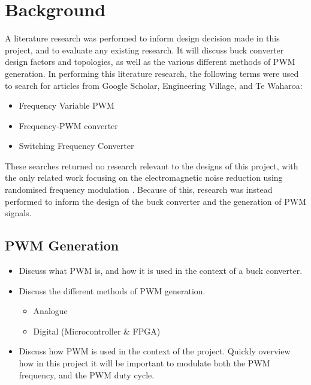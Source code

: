 \chapter{Background}\label{C:background}

A literature research was performed to inform design decision made in this project, and to evaluate any existing research. It will discuss buck converter design factors and topologies, as well as the various different methods of PWM generation. In performing this literature research, the following terms were used to search for articles from Google Scholar, Engineering Village, and Te Waharoa:

\begin{itemize}
    \item Frequency Variable PWM
    \item Frequency-PWM converter
    \item Switching Frequency Converter
\end{itemize}

These searches returned no research relevant to the designs of this project, with the only related work focusing on the electromagnetic noise reduction using randomised frequency modulation \cite{Roman2001,Familiant2016}. Because of this, research was instead performed to inform the design of the buck converter and the generation of PWM signals.

\section{PWM Generation}\label{S:PWM}

\begin{itemize}

    \item
          Discuss what PWM is, and how it is used in the context of a buck converter.

    \item
          Discuss the different methods of PWM generation.

          \begin{itemize}
              \item Analogue
              \item Digital (Microcontroller \& FPGA)
          \end{itemize}

    \item
          Discuss how PWM is used in the context of the project. Quickly overview how in this project it will be important to modulate both the PWM frequency, and the PWM duty cycle.

\end{itemize}


